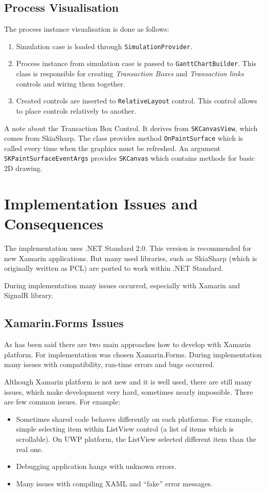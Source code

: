 \subsection{Process Visualisation}
The process instance visualisation is done as follows:
\begin{enumerate}
\item Simulation case is loaded through \texttt{SimulationProvider}.
\item Process instance from simulation case is passed to \texttt{GanttChartBuilder}. This class is responsible for creating \textit{Transaction Boxes} and \textit{Transaction links} controls and wiring them together.
\item Created controls are inserted to \texttt{RelativeLayout} control. This control allows to place controls relatively to another. 
\end{enumerate}

A note about the Transaction Box Control. It derives from \texttt{SKCanvasView}, which comes from SkiaSharp. The class provides method \texttt{OnPaintSurface} which is called every time when the graphics must be refreshed. An argument \texttt{SKPaintSurfaceEventArgs} provides \texttt{SKCanvas} which contains methods for basic 2D drawing. 
\section{Implementation Issues and Consequences}
The implementation uses .NET Standard 2.0. This version is recommended for new Xamarin applications. But many used libraries, such as SkiaSharp (which is originally written as PCL) are ported to work within .NET Standard.

During implementation many issues occurred, especially with Xamarin and SignalR library.
\subsection{Xamarin.Forms Issues}
As has been said there are two main approaches how to develop with Xamarin platform. For implementation was chosen Xamarin.Forms. During implementation many issues with compatibility, run-time errors and bugs occurred. 

Although Xamarin platform is not new and it is well used, there are still many issues, which make development very hard, sometimes nearly impossible. There are few common issues. For example:
\begin{itemize}
\item Sometimes shared code behaves differently on each platforms. For example, simple selecting item within ListView control (a list of items which is scrollable). On UWP platform, the ListView selected different item than the real one. 
\item Debugging application hangs with unknown errors.
\item Many issues with compiling XAML and ``fake'' error messages. 
\end{itemize}

